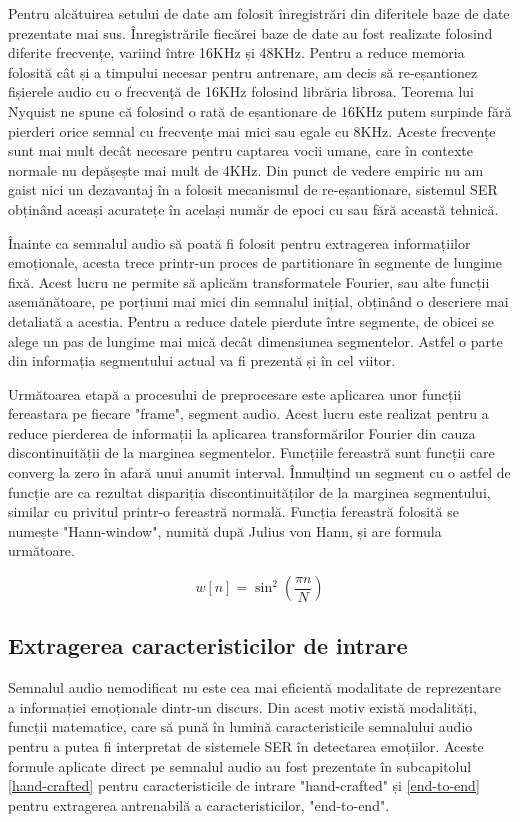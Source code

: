 \documentclass[a4paper,12pt]{book}
\begin{document}
					Pentru alcătuirea setului de date am folosit înregistrări din diferitele baze de date prezentate mai sus. Înregistrările fiecărei baze de date au fost realizate folosind diferite frecvențe, variind între 16KHz și 48KHz. Pentru a reduce memoria folosită cât și a  timpului necesar pentru antrenare, am decis să re-eșantionez fișierele audio cu o frecvență de 16KHz folosind librăria librosa. Teorema lui Nyquist ne spune că folosind o rată de eșantionare de 16KHz putem surpinde fără pierderi orice semnal cu frecvențe mai mici sau egale cu 8KHz. Aceste frecvențe sunt mai mult decât necesare pentru captarea vocii umane, care în contexte normale nu depășește mai mult de 4KHz. Din punct de vedere empiric nu am gaist nici un dezavantaj în a folosit mecanismul de re-eșantionare, sistemul SER obținând aceași acuratețe în același număr de epoci cu sau fără această tehnică. \par
					
					Înainte ca semnalul audio să poată fi folosit pentru extragerea informațiilor emoționale, acesta trece printr-un proces de partitionare în segmente de lungime fixă. Acest lucru ne permite să aplicăm transformatele Fourier, sau alte funcții asemănătoare, pe porțiuni mai mici din semnalul inițial, obținând o descriere mai detaliată a acestia. Pentru a reduce datele pierdute între segmente, de obicei se alege un pas de lungime mai mică decât dimensiunea segmentelor. Astfel o parte din informația segmentului actual va fi prezentă și în cel viitor. \par 
					Următoarea etapă a procesului de preprocesare este aplicarea unor funcții fereastara pe fiecare "frame", segment audio. Acest lucru este realizat pentru a reduce pierderea de informații la aplicarea transformărilor Fourier din cauza discontinuității de la marginea segmentelor. Funcțiile fereastră sunt funcții care converg la zero în afară unui anumit interval. Înmulțind un segment cu o astfel de funcție are ca rezultat dispariția discontinuităților de la marginea segmentului, similar cu privitul printr-o fereastră normală. Funcția fereastră folosită se numește "Hann-window", numită după Julius von Hann, și are formula următoare. \par
					\begin{equation}
					w[n]=\sin^2(\frac{\pi n}{N})
					\end{equation}
					
				\subsection{Extragerea caracteristicilor de intrare} \label{fex}
				Semnalul audio nemodificat nu este cea mai eficientă modalitate de reprezentare a informației emoționale dintr-un discurs. Din acest motiv există modalități, funcții matematice, care să pună în lumină caracteristicile semnalului audio pentru a putea fi interpretat de sistemele SER în detectarea emoțiilor. Aceste formule aplicate direct pe semnalul audio au fost prezentate în subcapitolul \ref{hand-crafted} pentru caracteristicile de intrare "hand-crafted" și \ref{end-to-end} pentru extragerea antrenabilă a caracteristicilor, "end-to-end". \par
				
\end{document}
